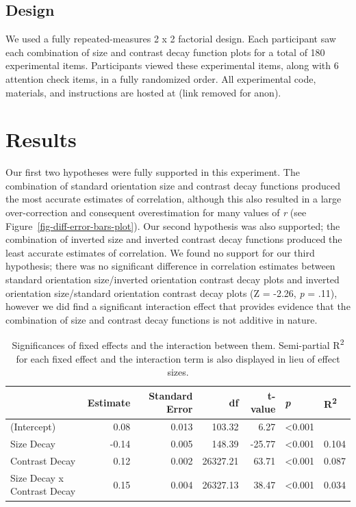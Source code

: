 \documentclass[manuscript, review, anonymous, screen]{acmart}
\begin{document}
\hypertarget{sec-design}{%
\subsection{Design}\label{sec-design}}

We used a fully repeated-measures 2 x 2 factorial design. Each
participant saw each combination of size and contrast decay function
plots for a total of 180 experimental items. Participants viewed these
experimental items, along with 6 attention check items, in a fully
randomized order. All experimental code, materials, and instructions are
hosted at (link removed for anon).

\hypertarget{sec-results}{%
\section{Results}\label{sec-results}}

Our first two hypotheses were fully supported in this experiment. The
combination of standard orientation size and contrast decay functions
produced the most accurate estimates of correlation, although this also
resulted in a large over-correction and consequent overestimation for
many values of \emph{r} (see Figure~\ref{fig-diff-error-bars-plot}). Our
second hypothesis was also supported; the combination of inverted size
and inverted contrast decay functions produced the least accurate
estimates of correlation. We found no support for our third hypothesis;
there was no significant difference in correlation estimates between
standard orientation size/inverted orientation contrast decay plots and
inverted orientation size/standard orientation contrast decay plots (Z =
-2.26, \emph{p} = .11), however we did find a significant interaction
effect that provides evidence that the combination of size and contrast
decay functions is not additive in nature.

\hypertarget{tbl-sig}{}
\begin{table}
\caption{\label{tbl-sig}Significances of fixed effects and the interaction between them.
Semi-partial R\textsuperscript{2} for each fixed effect and the
interaction term is also displayed in lieu of effect sizes. }\tabularnewline

\centering
\begin{tabular}{lrrrrll}
\toprule
  & Estimate & Standard Error & df & t-value & \textit{p} & R\textsuperscript{2}\\
\midrule
(Intercept) & 0.08 & 0.013 & 103.32 & 6.27 & <0.001 & \\
Size Decay & -0.14 & 0.005 & 148.39 & -25.77 & <0.001 & 0.104\\
Contrast Decay & 0.12 & 0.002 & 26327.21 & 63.71 & <0.001 & 0.087\\
Size Decay x Contrast Decay & 0.15 & 0.004 & 26327.13 & 38.47 & <0.001 & 0.034\\
\bottomrule
\end{tabular}
\end{table}
\end{document}
